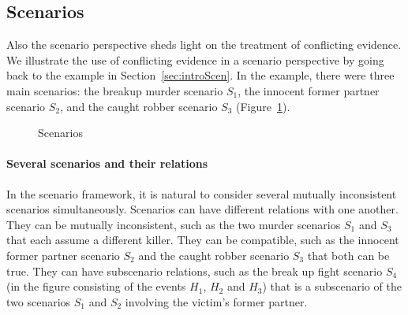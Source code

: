 \documentclass[10pt]{article}
\begin{document}
\subsection{Scenarios}

Also the scenario perspective sheds light on the treatment of conflicting evidence. We illustrate the use of conflicting evidence in a scenario perspective by going back to the example in Section~\ref{sec:introScen}. In the example, there were three main scenarios: the breakup murder scenario $S_1$, the innocent former partner scenario $S_2$, and the caught robber scenario $S_3$ (Figure~\ref{fig:scens}).




\begin{figure}[bt]
\centering

\caption{Scenarios\label{fig:scens}}
\end{figure}

\paragraph{Several scenarios and their relations}

In the scenario framework, it is natural to consider several mutually inconsistent scenarios simultaneously. Scenarios can have different relations with one another. They can be mutually inconsistent, such as the two murder scenarios $S_1$ and $S_3$ that each assume a different killer. They can be compatible, such as the innocent former partner scenario $S_2$ and the caught robber scenario $S_3$ that both can be true. They can have subscenario relations, such as the break up fight scenario $S_4$ (in the figure consisting of the events $H_1$, $H_2$ and $H_3$) that is a subscenario of the two scenarios $S_1$ and $S_2$ involving the victim's former partner.
\end{document}
